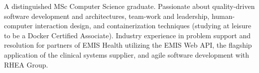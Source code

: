\begin{cvparagraph}

A distinguished MSc Computer Science graduate. Passionate about quality-driven software development and architectures, team-work and leadership, human-computer interaction design, and containerization techniques (studying at leisure to be a Docker Certified Associate). Industry experience in problem support and resolution for partners of EMIS Health utilizing the EMIS Web API, the flagship application of the clinical systems supplier, and agile software development with RHEA Group. 
\end{cvparagraph}
